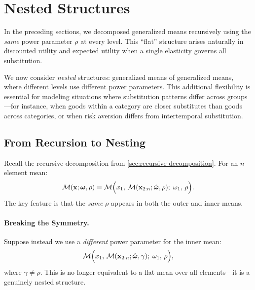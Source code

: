\section{Nested Structures}
\label{sec:nested-structures}

In the preceding sections, we decomposed generalized means recursively using the \emph{same} power parameter $\rho$ at every level. This ``flat'' structure arises naturally in discounted utility and expected utility when a single elasticity governs all substitution.

We now consider \emph{nested} structures: generalized means of generalized means, where different levels use different power parameters. This additional flexibility is essential for modeling situations where substitution patterns differ across groups---for instance, when goods within a category are closer substitutes than goods across categories, or when risk aversion differs from intertemporal substitution.

\subsection{From Recursion to Nesting}
\label{subsec:recursion-to-nesting}

Recall the recursive decomposition from \cref{sec:recursive-decomposition}. For an $n$-element mean:
\begin{equation}
\mathcal{M}(\mathbf{x}; \boldsymbol{\omega}, \rho) = \mathcal{M}\Big( x_1, \, \mathcal{M}(\mathbf{x}_{2:n}; \hat{\boldsymbol{\omega}}, \rho); \; \omega_1, \, \rho \Big).
\label{eq:recursion-recall}
\end{equation}
The key feature is that the \emph{same} $\rho$ appears in both the outer and inner means.

\paragraph{Breaking the Symmetry.}
Suppose instead we use a \emph{different} power parameter for the inner mean:
\begin{equation}
\mathcal{M}\Big( x_1, \, \mathcal{M}(\mathbf{x}_{2:n}; \hat{\boldsymbol{\omega}}, \gamma); \; \omega_1, \, \rho \Big),
\label{eq:nested-different-rho}
\end{equation}
where $\gamma \neq \rho$. This is no longer equivalent to a flat mean over all elements---it is a genuinely nested structure.

